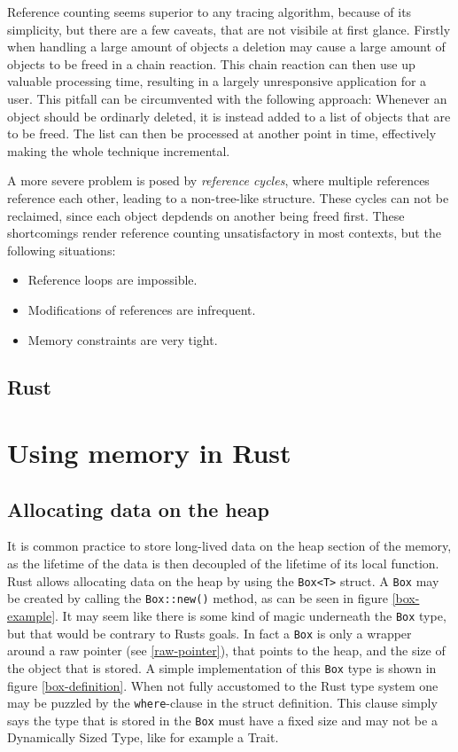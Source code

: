 \documentclass[twocolumn]{article}
\begin{document}
Reference counting seems superior to any tracing algorithm, because of its simplicity, but there are a few caveats, that are not visibile at first glance.
Firstly when handling a large amount of objects a deletion may cause a large amount of objects to be freed in a chain reaction.
This chain reaction can then use up valuable processing time, resulting in a largely unresponsive application for a user.
This pitfall can be circumvented with the following approach: Whenever an object should be ordinarly deleted, it is instead added to a list of objects that are to be freed.
The list can then be processed at another point in time, effectively making the whole technique incremental.

A more severe problem is posed by \textit{reference cycles}, where multiple references reference each other, leading to a non-tree-like structure.
These cycles can not be reclaimed, since each object depdends on another being freed first.
These shortcomings render reference counting unsatisfactory in most contexts, but the following situations:
\begin{itemize}
        \item Reference loops are impossible.
        \item Modifications of references are infrequent.
        \item Memory constraints are very tight.
\end{itemize}
\subsection{Rust}
\section{Using memory in Rust}
\subsection{Allocating data on the heap}
\label{box}
It is common practice to store long-lived data on the heap section of the memory, as the lifetime of the data is then decoupled of the lifetime of its local function.
Rust allows allocating data on the heap by using the \texttt{Box<T>} struct.
A \texttt{Box} may be created by calling the \texttt{Box::new()} method, as can be seen in figure \ref{box-example}.
It may seem like there is some kind of magic underneath the \texttt{Box} type, but that would be contrary to Rusts goals.
In fact a \texttt{Box} is only a wrapper around a raw pointer (see \ref{raw-pointer}), that points to the heap, and the size of the object that is stored.
A simple implementation of this \texttt{Box} type is shown in figure \ref{box-definition}.
When not fully accustomed to the Rust type system one may be puzzled by the \texttt{where}-clause in the struct definition.
This clause simply says the type that is stored in the \texttt{Box} must have a fixed size and may not be a Dynamically Sized Type, like for example a Trait.
\end{document}

